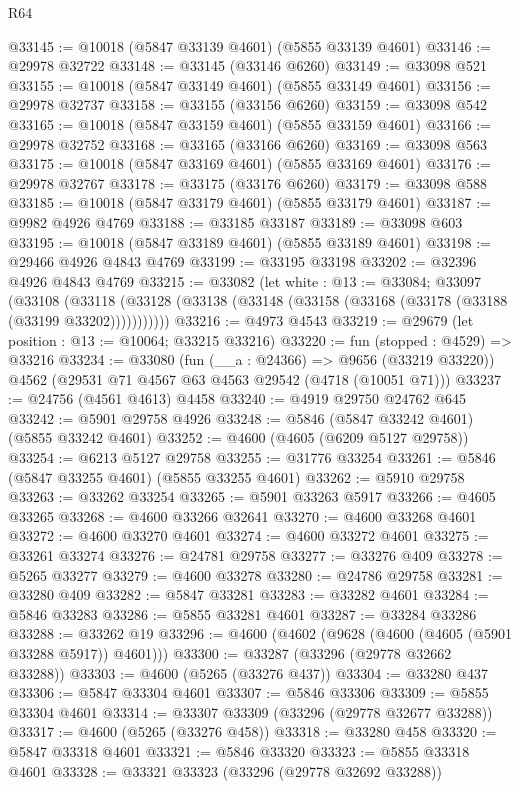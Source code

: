 \begin{lexlean}{R64}
\begin{coremodule}
@33145 := @10018 (@5847 @33139 @4601) (@5855 @33139 @4601)
@33146 := @29978 @32722
@33148 := @33145 (@33146 @6260)
@33149 := @33098 @521
@33155 := @10018 (@5847 @33149 @4601) (@5855 @33149 @4601)
@33156 := @29978 @32737
@33158 := @33155 (@33156 @6260)
@33159 := @33098 @542
@33165 := @10018 (@5847 @33159 @4601) (@5855 @33159 @4601)
@33166 := @29978 @32752
@33168 := @33165 (@33166 @6260)
@33169 := @33098 @563
@33175 := @10018 (@5847 @33169 @4601) (@5855 @33169 @4601)
@33176 := @29978 @32767
@33178 := @33175 (@33176 @6260)
@33179 := @33098 @588
@33185 := @10018 (@5847 @33179 @4601) (@5855 @33179 @4601)
@33187 := @9982 @4926 @4769
@33188 := @33185 @33187
@33189 := @33098 @603
@33195 := @10018 (@5847 @33189 @4601) (@5855 @33189 @4601)
@33198 := @29466 @4926 @4843 @4769
@33199 := @33195 @33198
@33202 := @32396 @4926 @4843 @4769
@33215 := @33082
    (let white : @13 := @33084;
    @33097
      (@33108
        (@33118 (@33128 (@33138 (@33148 (@33158 (@33168 (@33178 (@33188 (@33199 @33202)))))))))))
@33216 := @4973 @4543
@33219 := @29679 (let position : @13 := @10064; @33215 @33216)
@33220 := fun (stopped : @4529) => @33216
@33234 := @33080
    (fun (__a : @24366) => @9656 (@33219 @33220))
    @4562
    (@29531 @71 @4567 @63 @4563 @29542 (@4718 (@10051 @71)))
@33237 := @24756 (@4561 @4613) @4458
@33240 := @4919 @29750 @24762 @645
@33242 := @5901 @29758 @4926
@33248 := @5846 (@5847 @33242 @4601) (@5855 @33242 @4601)
@33252 := @4600 (@4605 (@6209 @5127 @29758))
@33254 := @6213 @5127 @29758
@33255 := @31776 @33254
@33261 := @5846 (@5847 @33255 @4601) (@5855 @33255 @4601)
@33262 := @5910 @29758
@33263 := @33262 @33254
@33265 := @5901 @33263 @5917
@33266 := @4605 @33265
@33268 := @4600 @33266 @32641
@33270 := @4600 @33268 @4601
@33272 := @4600 @33270 @4601
@33274 := @4600 @33272 @4601
@33275 := @33261 @33274
@33276 := @24781 @29758
@33277 := @33276 @409
@33278 := @5265 @33277
@33279 := @4600 @33278
@33280 := @24786 @29758
@33281 := @33280 @409
@33282 := @5847 @33281
@33283 := @33282 @4601
@33284 := @5846 @33283
@33286 := @5855 @33281 @4601
@33287 := @33284 @33286
@33288 := @33262 @19
@33296 := @4600 (@4602 (@9628 (@4600 (@4605 (@5901 @33288 @5917)) @4601)))
@33300 := @33287 (@33296 (@29778 @32662 @33288))
@33303 := @4600 (@5265 (@33276 @437))
@33304 := @33280 @437
@33306 := @5847 @33304 @4601
@33307 := @5846 @33306
@33309 := @5855 @33304 @4601
@33314 := @33307 @33309 (@33296 (@29778 @32677 @33288))
@33317 := @4600 (@5265 (@33276 @458))
@33318 := @33280 @458
@33320 := @5847 @33318 @4601
@33321 := @5846 @33320
@33323 := @5855 @33318 @4601
@33328 := @33321 @33323 (@33296 (@29778 @32692 @33288))

\end{coremodule}
\end{lexlean}
